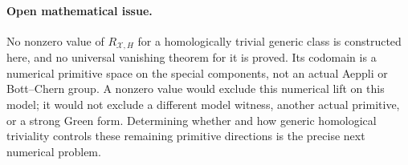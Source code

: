 \paragraph{Open mathematical issue.}
No nonzero value of $R_{\mathcal X,H}$ for a homologically
trivial generic class is constructed here, and no universal
vanishing theorem for it is proved.  Its codomain is a
numerical primitive space on the special components, not an
actual Aeppli or Bott--Chern group.  A nonzero value would
exclude this numerical lift on this model; it would not
exclude a different model witness, another actual primitive,
or a strong Green form.  Determining whether and how generic
homological triviality controls these remaining primitive
directions is the precise next numerical problem.
